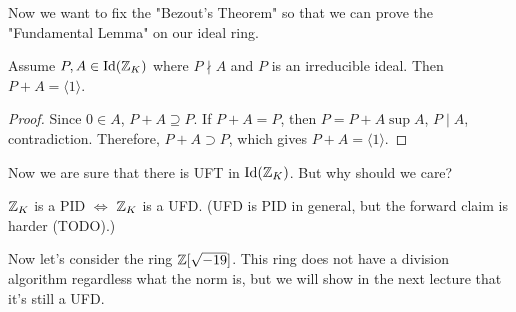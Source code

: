 \documentclass[12pt,twoside=semi,openright,numbers=noenddot]{scrbook}
\begin{document}
Now we want to fix the "Bezout's Theorem" so that we can prove the "Fundamental Lemma" on our ideal ring.
\begin{theorem}
    Assume $P, A \in \text{Id}(\mathbb Z_K)$ where $P \nmid A$ and $P$ is an irreducible ideal. Then $P+A = \langle 1 \rangle$.
\end{theorem}
    \begin{proof}
        Since $0 \in A$, $P+A \supseteq P$. If $P+A = P$, then $P = P+A \sup A$, $P \mid A$, contradiction.
        Therefore, $P+A \supset P$, which gives $P+A = \langle 1 \rangle$.
    \end{proof}

Now we are sure that there is UFT in $\text{Id}(\mathbb Z_K)$. But why should we care?
\begin{remark}
    $\mathbb Z_K$ is a PID $\Leftrightarrow$ $\mathbb Z_K$ is a UFD. (UFD is PID in general, but the forward claim is harder (TODO).)
\end{remark}

Now let's consider the ring $\mathbb Z[\sqrt{-19}]$. This ring does not have a division algorithm regardless what the norm is, but 
we will show in the next lecture that it's still a UFD.
\end{document}
